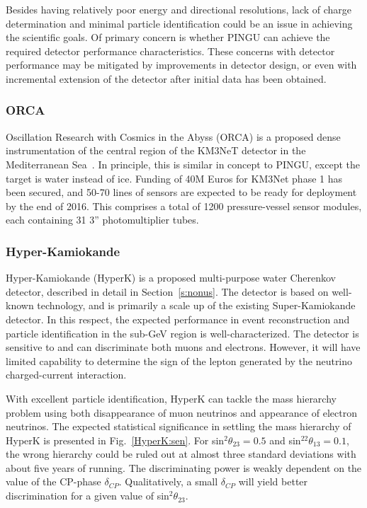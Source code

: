 Besides having relatively poor energy and directional resolutions, 
lack of charge determination and minimal particle identification 
could be an issue in achieving the scientific goals. 
Of primary concern is whether PINGU can achieve the required detector
performance characteristics.  These concerns with detector performance may be
mitigated by improvements in detector design, or even with incremental
extension of the detector after initial data has been obtained.


\subsubsection{ORCA}

Oscillation Research with Cosmics in the Abyss (ORCA) is a proposed
dense instrumentation of the central region of the KM3NeT detector in
the Mediterranean Sea~\cite{atm:Coyle}.  In principle, this is similar
in concept to PINGU, except the target is water instead of ice.  Funding of 40M Euros for KM3Net phase 1 has been secured, and 50-70
lines of sensors are expected to be ready for deployment by the end of
2016.  This comprises a total of 1200 pressure-vessel sensor modules,
each containing 31 3'' photomultiplier tubes.

\subsubsection{Hyper-Kamiokande}

Hyper-Kamiokande (HyperK) is a proposed multi-purpose water Cherenkov
detector, described in detail in Section~\ref{s:nonus}. 
The detector is based on well-known technology, and
is primarily a scale up of the existing Super-Kamiokande detector.  In
this respect, the expected performance in event reconstruction and
particle identification in the sub-GeV region is well-characterized.
The detector is  sensitive to and can discriminate both muons
and electrons.  However, it will have limited capability to determine
the sign of the lepton generated by the neutrino charged-current
interaction.

With excellent particle identification, HyperK can tackle the mass hierarchy
problem using both disappearance of muon neutrinos and appearance of
electron neutrinos. 
The expected statistical significance in settling the mass hierarchy of HyperK
is presented in Fig.~\ref{HyperK:sen}.
For sin$^2\theta_{23}=0.5$ and sin$^22\theta_{13}=0.1$, the wrong hierarchy
could be ruled out at almost three standard deviations with about five years of running.  
The discriminating power is weakly dependent on the value of the CP-phase 
$\delta_{CP}$.  Qualitatively, a small $\delta_{CP}$ will yield better discrimination 
for a given value of sin$^2\theta_{23}$.

